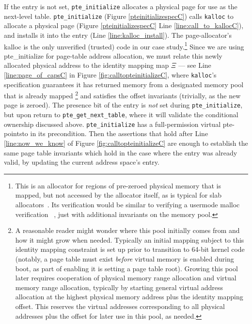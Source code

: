If the entry is not set, \lstinline|pte_initialize|  
allocates a physical page for use as the next-level table.
\lstinline|pte_initialize| (Figure \ref{pteinitializespecC}) calls
\lstinline|kalloc| to allocate a physical page (Figure \ref{pteinitializespecC} Line \ref{line:call_to_kallocC}),
and installs it into the entry (Line \ref{line:kalloc_install}).
The page-allocator's \textsf{kalloc}
is the only unverified (trusted) code in our case study.\footnote{
  This is an allocator for regions of pre-zeroed physical memory that is mapped, but not accessed by the allocator itself,
  as is typical for slab allocators~\cite{bonwick1994slab}.
  Its verification would be similar to verifying a usermode \textsf{malloc} verification ~\cite{Chlipala2013Bedrock,wickerson2010explicit},
  just with additional invariants on the memory pool.
} 
Since we are using \textsf{pte\_initialize} for page-table address allocation, we must relate this newly
allocated physical address to the identity mapping map $\Xi$ --- 
see Line \ref{line:page_of_capsC} in Figure \ref{fig:calltopteinitializeC}, where
\texttt{kalloc}'s specification guarantees it has returned memory from a designated memory
pool that is already mapped
\footnote{A reasonable reader might wonder where this pool
initially comes from and how it might grow when needed. Typically an initial mapping subject to this identity mapping
constraint is set up prior to transition to 64-bit kernel code (notably,
a page table must exist \emph{before} virtual memory is enabled during boot, as part of enabling it is setting
a page table root).
Growing this pool later requires cooperation of physical memory range allocation and virtual memory range allocation,
typically by starting general virtual address allocation at the highest physical memory address plus the identity mapping offset.
This reserves the virtual addresses corresponding to all physical addresses plus the offset for later use in this pool,
as needed.
} 
and satisfies the offset invariants (trivially, as the new page is zeroed).
The presence bit of the entry is \emph{not} set during \lstinline|pte_initialize|, but upon
return to \lstinline|pte_get_next_table|, where it will validate the conditional ownership discussed above.
\lstinline|pte_initialize| has a full-permission virtual pte-pointsto in its precondition.
Then the assertions that hold after Line \ref{line:now_we_know} of Figure \ref{fig:calltopteinitializeC}
are enough to establish the same page table invariants which hold in the case where the entry was already valid,
by updating the current address space's entry.



